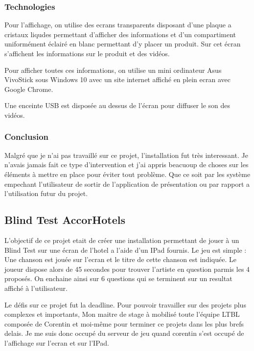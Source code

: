 \documentclass{article}
\begin{document}
\subsubsection{Technologies}

Pour l'affichage, on utilise des ecrans transparents disposant d'une plaque a cristaux liqudes permettant d'afficher des informations et d'un compartiment uniformément éclairé en blanc permettant d'y placer un produit.
Sur cet écran s'affichent les informations sur le produit et des vidéos.

Pour afficher toutes ces informations, on utilise un mini ordinateur Asus VivoStick sous Windows 10 avec un site internet affiché en plein ecran avec Google Chrome.

Une enceinte USB est disposée au dessus de l'écran pour diffuser le son des vidéos.

\subsubsection{Conclusion}

Malgré que je n'ai pas travaillé sur ce projet, l'installation fut très interessant.
Je n'avais jamais fait ce type d'intervention et j'ai appris beacuoup de choses sur les éléments à mettre en place pour éviter tout problème.
Que ce soit par les système empechant l'utilisateur de sortir de l'application de présentation ou par rapport a l'utilisation futur du projet.

\subsection{Blind Test AccorHotels}

L'objectif de ce projet etait de créer une installation permettant de jouer à un Blind Test sur une écran de l'hotel a l'aide d'un IPad fournis.
Le jeu est simple : Une chanson est jouée sur l'ecran et le titre de cette chanson est indiquée.
Le joueur dispose alors de 45 secondes pour trouver l'artiste en question parmis les 4 proposés.
On enchaine ainsi sur 6 questions qui se terminent sur un resultat affiché à l'utilisateur.

Le défis sur ce projet fut la deadline.
Pour pouvoir travailler sur des projets plus complexes et importants, Mon maitre de stage à mobilisé toute l'équipe LTBL composée de Corentin et moi-même pour terminer ce projets dans les plus brefs delais.
Je me suis donc occupé du serveur de jeu quand corentin s'est occupé de l'affichage sur l'ecran et sur l'IPad.
\end{document}
